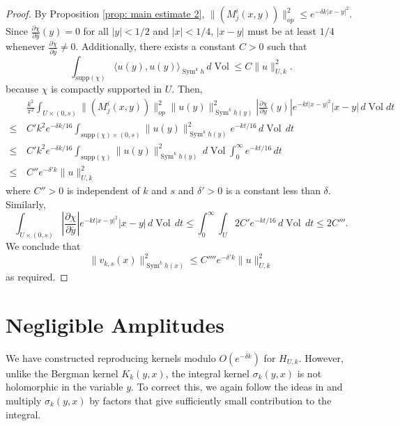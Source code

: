 \documentclass{amsart}
\theoremstyle{definition}
\theoremstyle{remark}
\numberwithin{equation}{section}
\newcommand{\deriv}[2]{\frac{\partial #1}{\partial #2}}
\DeclareMathOperator{\Sym}{Sym}
\DeclareMathOperator{\Vol}{Vol}
\begin{document}
\begin{proof}
By Proposition \ref{prop: main estimate 2}, $\|(M^i_j(x,y))\|_{op}^2 \leq e^{-\delta k|x-y|^2}$. Since $\deriv{\chi}{\overline{y}} (y) = 0$ for all $|y| < 1/2$ and $|x| < 1/4$, $|x-y|$ must be at least $1/4$ whenever $\deriv{\chi}{\overline{y}} \neq 0$. Additionally, there exists a constant $C > 0$ such that
$$
\int_{\text{supp}(\chi)}  \langle u(y), u(y)\rangle_{\Sym^kh} \,d\Vol  \leq C \|u\|_{U,k}^2.
$$
because $\chi$ is compactly supported in $U$. Then, 
\begin{align*}
& \frac{k^2}{\pi^2} \int_{U \times (0,s)} \|(M^i_j(x,y))\|_{op}^2 \|u(y)\|_{\Sym^k h(y)}^2 \left |\deriv {\chi}{\overline{y}} (y) \right | e^{-kt|x-y|^2} |x-y| \,d\Vol dt  \\
    \leq \hspace{2pt} & C' k^{2} e^{-\delta k/16} \int_{\text{supp}(\chi) \times (0,s)}  \|u(y)\|_{\Sym^k h(y)}^2 e^{-kt/16} \,d\Vol \,dt \\
     \leq \hspace{2pt} & C' k^{2} e^{-\delta k/16} \int_{\text{supp}(\chi)}  \|u(y)\|_{\Sym^k h(y)}^2  \,d\Vol\int_0^\infty e^{-kt/16} \,dt \\
    \leq \hspace{2pt} &  C'' e^{-\delta'k} \|u\|_{U,k}^2
\end{align*}
where $C'' > 0$ is independent of $k$ and $s$ and $\delta' > 0$ is a constant less than $\delta$. Similarly,
$$
\int_{U \times (0,s)} \left | \deriv{\chi}{\overline{y}} \right | e^{-kt|x-y|^2} |x-y| \,d\Vol \,dt    
    \leq  \int_0^\infty \int_{U} 2C' e^{-kt/16} \,d\Vol \,dt 
    \leq  2C'''.
$$
We conclude that 
$$
\|v_{k,s}(x)\|_{\Sym^k h (x)}^2 \leq C'''' e^{-\delta'k} \|u\|_{U,k}^2
$$
as required.







\end{proof}


\section{Negligible Amplitudes}

We have constructed reproducing kernels modulo $O(e^{-\delta k})$ for $H_{U,k}$. However, unlike the Bergman kernel $K_k(y,x)$, the integral kernel $\sigma_k(y,x)$ is not holomorphic in the variable $y$. To correct this, we again follow the ideas in \cite{BBS} and multiply $\sigma_k(y,x)$ by factors that give sufficiently small contribution to the integral. 
\end{document}
